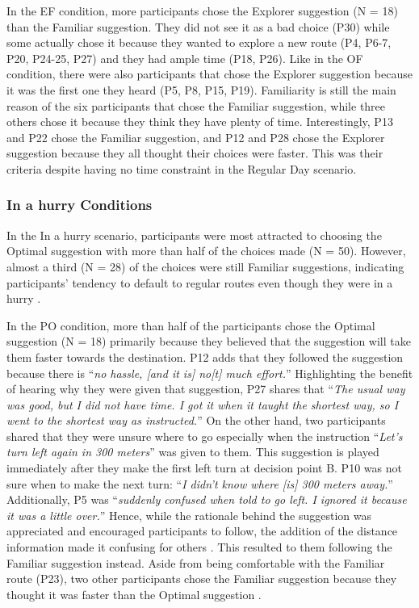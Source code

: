 In the EF condition, more participants chose the Explorer suggestion (N = 18) than the Familiar suggestion. They did not see it as a bad choice (P30) while some actually chose it because they wanted to explore a new route (P4, P6-7, P20, P24-25, P27) and they had ample time (P18, P26). Like in the OF condition, there were also participants that chose the Explorer suggestion because it was the first one they heard (P5, P8, P15, P19). Familiarity is still the main reason of the six participants that chose the Familiar suggestion, while three others chose it because they think they have plenty of time. Interestingly, P13 and P22 chose the Familiar suggestion, and P12 and P28 chose the Explorer suggestion because they all thought their choices were faster. This was their criteria despite having no time constraint in the Regular Day scenario. 

\subsubsection{In a hurry Conditions}
In the In a hurry scenario, participants were most attracted to choosing the Optimal suggestion with more than half of the choices made (N = 50). However, almost a third (N = 28) of the choices were still Familiar suggestions, indicating participants' tendency to default to regular routes even though they were in a hurry \cite{Samson:2019:EFI:3290605.3300601, Zhu2015DoPrinciple, Tang2016AnalyzingData}. 

In the PO condition, more than half of the participants chose the Optimal suggestion (N = 18) primarily because they believed that the suggestion will take them faster towards the destination. P12 adds that they followed the suggestion because there is ``\textit{no hassle, [and it is] no[t] much effort.}'' Highlighting the benefit of hearing why they were given that suggestion, P27 shares that ``\textit{The usual way was good, but I did not have time. I got it when it taught the shortest way, so I went to the shortest way as instructed.}'' On the other hand, two participants shared that they were unsure where to go especially when the instruction ``\textit{Let's turn left again in 300 meters}'' was given to them. This suggestion is played immediately after they make the first left turn at decision point B. P10 was not sure when to make the next turn: ``\textit{I didn't know where [is] 300 meters away.}'' Additionally, P5 was ``\textit{suddenly confused when told to go left. I ignored it because it was a little over.}'' Hence, while the rationale behind the suggestion was appreciated and encouraged participants to follow, the addition of the distance information made it confusing for others \cite{Antrobus2017Driver-PassengerSystems}. This resulted to them following the Familiar suggestion instead. Aside from being comfortable with the Familiar route (P23), two other participants chose the Familiar suggestion because they thought it was faster than the Optimal suggestion \cite{Peterson2018}.

